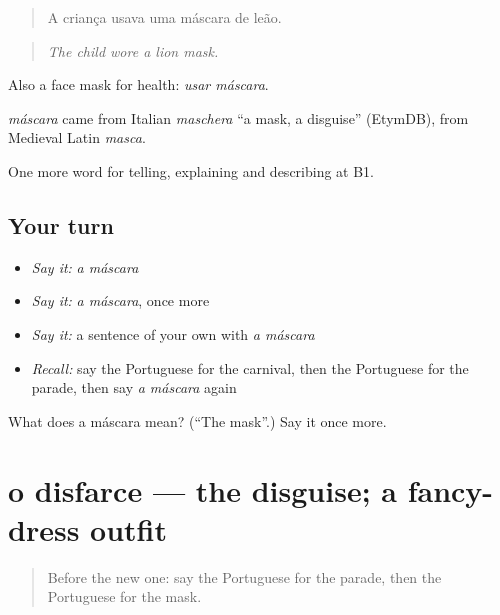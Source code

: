 \begin{quote}
A criança usava uma máscara de leão.
\end{quote}

\begin{quote}
\emph{The child wore a lion mask.}
\end{quote}

Also a face mask for health: \emph{usar máscara}.

\begin{cousinweb}
\emph{máscara} came from Italian \emph{maschera} \textquotedblleft{}a mask, a disguise\textquotedblright{} (EtymDB), from Medieval Latin \emph{masca}.
\end{cousinweb}

\begin{grammarlens}[title={What you've built}]
One more word for telling, explaining and describing at B1.
\end{grammarlens}

\subsection*{Your turn}
\begin{itemize}
\raggedright
  \item \emph{Say it:} \emph{a máscara}
  \item \emph{Say it:} \emph{a máscara}, once more
  \item \emph{Say it:} a sentence of your own with \emph{a máscara}
  \item \emph{Recall:} say the Portuguese for the carnival, then the Portuguese for the parade, then say \emph{a máscara} again
\end{itemize}

\begin{tcolorbox}[breakable,colback=teal!4,colframe=teal!35!black,title={Before you move on}]
What does a máscara mean? (\textquotedblleft{}The mask\textquotedblright{}.) Say it once more.
\end{tcolorbox}
\section[o disfarce]{o disfarce — the disguise; a fancy-dress outfit}

\label{lesson:PT-C321-disfarce}



\begin{quote}
Before the new one: say the Portuguese for the parade, then the Portuguese for the mask.
\end{quote}

